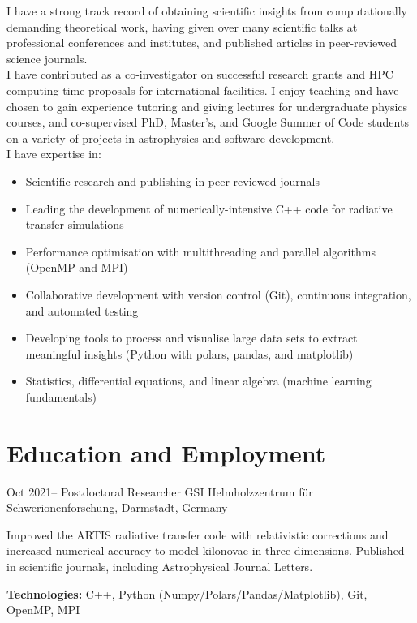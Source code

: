 \documentclass[11pt]{article} %
\begin{document}
I have a strong track record of obtaining scientific insights from computationally demanding theoretical work, having given over many scientific talks at professional conferences and institutes, and published articles in peer-reviewed science journals.\\

I have contributed as a co-investigator on successful research grants and HPC computing time proposals for international facilities. I enjoy teaching and have chosen to gain experience tutoring and giving lectures for undergraduate physics courses, and co-supervised PhD, Master's, and Google Summer of Code students on a variety of projects in astrophysics and software development.\\
%


I have expertise in:
\begin{itemize}
  \item Scientific research and publishing in peer-reviewed journals
  \item Leading the development of numerically-intensive C++ code for radiative transfer simulations
  \item Performance optimisation with multithreading and parallel algorithms (OpenMP and MPI)
  \item Collaborative development with version control (Git), continuous integration, and automated testing
  \item Developing tools to process and visualise large data sets to extract meaningful insights (Python with polars, pandas, and matplotlib)
  \item Statistics, differential equations, and linear algebra (machine learning fundamentals)
\end{itemize}



\section{Education and Employment}

\job
{Oct 2021--}{}
{Postdoctoral Researcher}
{}
{GSI Helmholzzentrum für Schwerionenforschung, Darmstadt, Germany}
{\begin{itemize-noindent}
\item{Improved the ARTIS radiative transfer code with relativistic corrections and increased numerical accuracy to model kilonovae in three dimensions. Published in scientific journals, including Astrophysical Journal Letters.}
\end{itemize-noindent}
\textbf{Technologies:} C++, Python (Numpy/Polars/Pandas/Matplotlib), Git, OpenMP, MPI\\
}
\end{document}
